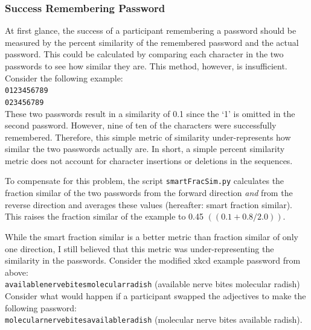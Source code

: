 \documentclass{article}
\begin{document}
\subsubsection*{Success Remembering Password}
At first glance, the success of a participant remembering a password should be measured by the percent similarity of the remembered password and the actual password. This could be calculated by comparing each character in the two passwords to see how similar they are. This method, however, is insufficient. Consider the following example:\\


\noindent\texttt{0123456789}\\
\texttt{023456789} \\

These two passwords result in a similarity of 0.1 since the `1' is omitted in the second password. However, nine of ten of the characters were successfully remembered. Therefore, this simple metric of similarity under-represents how similar the two passwords actually are. In short, a simple percent similarity metric does not account for character insertions or deletions in the sequences.

To compensate for this problem, the script \texttt{smartFracSim.py} calculates the fraction similar of the two passwords from the forward direction \emph{and} from the reverse direction and averages these values (hereafter: smart fraction similar). This raises the fraction similar of the example to 0.45 $((0.1 + 0.8 / 2.0))$.

While the smart fraction similar is a better metric than fraction similar of only one direction, I still believed that this metric was under-representing the similarity in the passwords. Consider the modified xkcd example password from above: \\

\noindent \texttt{availablenervebitesmolecularradish} (available nerve bites molecular radish) \\

Consider what would happen if a participant swapped the adjectives to make the following password:\\

\noindent \texttt{molecularnervebitesavailableradish} (molecular nerve bites available radish). \\
\end{document}
